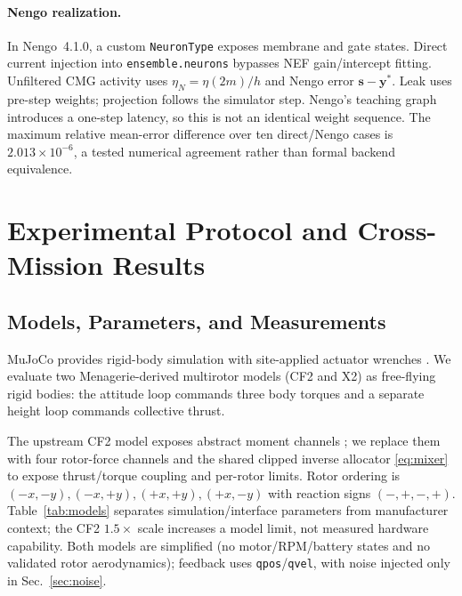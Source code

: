 \documentclass[letterpaper, 10 pt, conference]{ieeeconf}
\begin{document}
\paragraph{Nengo realization.}
In Nengo~4.1.0, a custom \texttt{NeuronType} exposes membrane and gate states. Direct current injection into \texttt{ensemble.neurons} bypasses NEF gain/intercept fitting. Unfiltered CMG activity uses $\eta_N=\eta(2m)/h$ and Nengo error $\bm s-\bm y^*$. Leak uses pre-step weights; projection follows the simulator step. Nengo's teaching graph introduces a one-step latency, so this is not an identical weight sequence. The maximum relative mean-error difference over ten direct/Nengo cases is $2.013\times10^{-6}$, a tested numerical agreement rather than formal backend equivalence.


\section{Experimental Protocol and Cross-Mission Results}
\label{sec:results}
\subsection{Models, Parameters, and Measurements}

MuJoCo provides rigid-body simulation with site-applied actuator wrenches \cite{todorov2012mujoco}. We evaluate two Menagerie-derived multirotor models \cite{menagerieModels} (CF2 and X2) as free-flying rigid bodies: the attitude loop commands three body torques and a separate height loop commands collective thrust.

The upstream CF2 model exposes abstract moment channels \cite{menagerieCF2}; we replace them with four rotor-force channels and the shared clipped inverse allocator \eqref{eq:mixer} to expose thrust/torque coupling and per-rotor limits. Rotor ordering is $(-x,-y),(-x,+y),(+x,+y),(+x,-y)$ with reaction signs $(-,+,-,+)$. Table~\ref{tab:models} separates simulation/interface parameters from manufacturer context; the CF2 $1.5\times$ scale increases a model limit, not measured hardware capability. Both models are simplified (no motor/RPM/battery states and no validated rotor aerodynamics); feedback uses \texttt{qpos}/\texttt{qvel}, with noise injected only in Sec.~\ref{sec:noise}.
\end{document}
